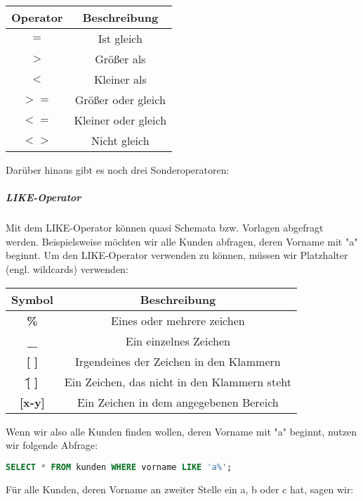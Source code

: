 \documentclass{article}
\begin{document}
	\begin{center}
		\def\arraystretch{1.1}
		\begin{tabular}{ | c | c |}
			\hline 
			\textbf{Operator} 	& \textbf{Beschreibung} \\
			\hline
			\hline
			\textbf{$=$} 		& Ist gleich \\
			\textbf{$>$} 		& Größer als \\
			\textbf{$<$} 		& Kleiner als \\
			\textbf{$>=$} 		& Größer oder gleich \\
			\textbf{$<=$} 		& Kleiner oder gleich \\
			\textbf{$<>$} 		& Nicht gleich \\
			\hline
		\end{tabular}
	\end{center}

	Darüber hinaus gibt es noch drei Sonderoperatoren:

	\subparagraph{LIKE-Operator}
	Mit dem LIKE-Operator können quasi Schemata bzw. Vorlagen abgefragt werden. Beispielsweise möchten wir alle Kunden abfragen, deren Vorname mit "a" beginnt.
	Um den LIKE-Operator verwenden zu können, müssen wir Platzhalter (engl. wildcards) verwenden:
	
	\begin{center}
		\def\arraystretch{1.1}
		\begin{tabular}{ | c | c |}
			\hline
			\textbf{Symbol} 	& \textbf{Beschreibung} \\
			\hline
			\hline
			\textbf{\%} 		& Eines oder mehrere zeichen \\
			\textbf{\_} 		& Ein einzelnes Zeichen \\
			\textbf{[ ]} 		& Irgendeines der Zeichen in den Klammern \\
			\textbf{\^ [  ]} 	& Ein Zeichen, das nicht in den Klammern steht \\
			\textbf{[x-y]} 		& Ein Zeichen in dem angegebenen Bereich \\
			\hline
		\end{tabular}
	\end{center}

	Wenn wir also alle Kunden finden wollen, deren Vorname mit "a" beginnt, nutzen wir folgende Abfrage:

	\begin{lstlisting}[language=SQL]
	SELECT * FROM kunden WHERE vorname LIKE 'a%';
	\end{lstlisting}

	Für alle Kunden, deren Vorname an zweiter Stelle ein a, b oder c hat, sagen wir:
\end{document}
